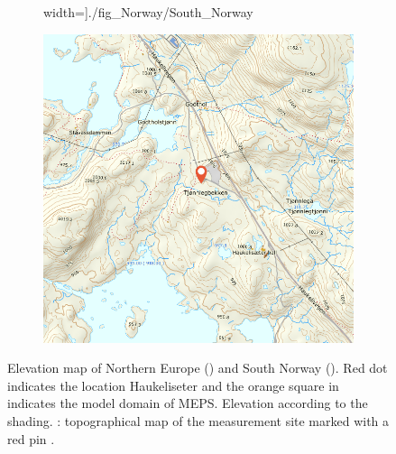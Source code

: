 \begin{figure}[t]
\begin{subfigure}[b]{0.32\textwidth}
		width=\textwidth]{./fig_Norway/South_Norway}
		\caption{}\label{fig:site:Nzoom}
	\end{subfigure}
	\begin{subfigure}[b]{0.32\textwidth}
		\includegraphics[width=\textwidth]{./fig_Norway/Haukeli_site}
		\caption{}\label{fig:site:kartverket}
	\end{subfigure}
	\caption{Elevation map of Northern Europe (\protect{}) and South Norway (\protect{}). Red dot indicates the location Haukeliseter and the orange square in  indicates the model domain of MEPS. Elevation according to the shading. \protect{}: topographical map of the measurement site marked with a red pin \citep{kartverket_norgeskart_2018}.} \label{fig:site}
\end{figure}